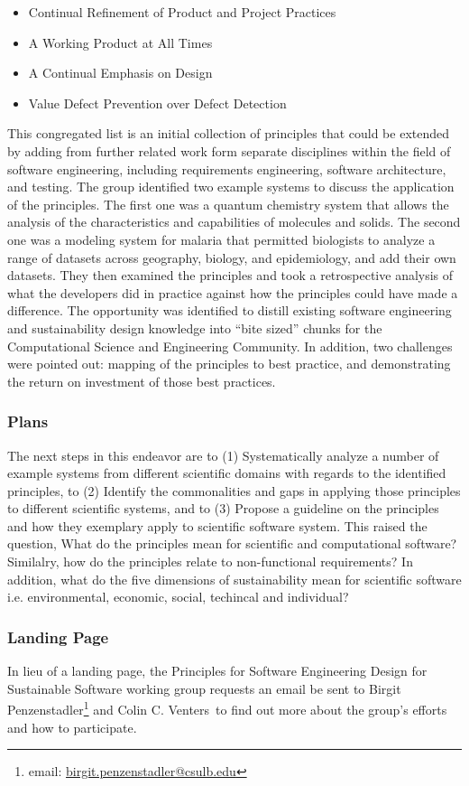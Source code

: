 \begin{itemize}
\item Continual Refinement of Product and Project Practices
\item A Working Product at All Times
\item A Continual Emphasis on Design
\item Value Defect Prevention over Defect Detection
\end{itemize}

This congregated list is an initial collection of principles that could be extended by adding from further 
related work form separate disciplines within the field of software engineering, including requirements 
engineering, software architecture, and testing. The group identified two example systems to discuss 
the application of the principles. The first one was a quantum chemistry system that allows the analysis 
of the characteristics and capabilities of molecules and solids. The second one was a modeling system 
for malaria that permitted biologists to analyze a range of datasets across geography, biology, and 
epidemiology, and add their own datasets. They then examined the principles and took a retrospective 
analysis of what the developers did in practice against how the principles could have made a 
difference. The opportunity was identified to distill existing software engineering and sustainability 
design knowledge into ``bite sized'' chunks for the Computational Science and Engineering 
Community. In addition, two challenges were pointed out: mapping of the principles to best practice, 
and  demonstrating the return on investment of those best practices.

\subsubsection{Plans}
The next steps in this endeavor are to (1) Systematically analyze a number of example systems from different scientific domains with regards to the identified principles, to (2) Identify the commonalities and gaps in applying those principles to different scientific systems, and to (3) Propose a guideline on the principles and how they exemplary apply to scientific software system. This raised the question, What do the principles mean for scientific and computational software? Similalry, how do the principles relate to non-functional requirements? In addition, what do the five dimensions of sustainability mean for scientific software i.e. environmental, economic, social, techincal and individual?

\subsubsection{Landing Page}
In lieu of a landing page, the Principles for Software Engineering Design for Sustainable Software working group requests an email be sent to Birgit Penzenstadler\footnote{email: \href{mailto:birgit.penzenstadler@csulb.edu}{birgit.penzenstadler@csulb.edu}} and Colin C. Venters\ to find out more about the group's efforts and how to participate.
